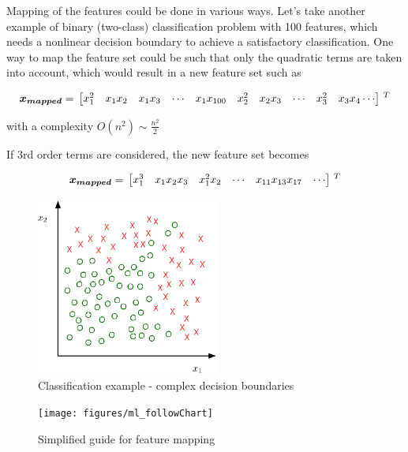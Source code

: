 Mapping of the features could be done in various ways. 
Let's take another example of binary (two-class) classification problem with 100 features, which needs a nonlinear decision boundary to achieve a satisfactory classification.
One way to map the feature set could be such that only the quadratic terms are taken into account, which would result in a new feature set such as
 
\begin{equation}{\label{eqn:featureMapping3}}
\bm{x_{mapped}}
=\,
\begin{bmatrix}
x_1^2 & x_1x_2 & x_1x_3 & \cdots & x_1x_{100} & x_2^2 & x_2x_3 & \cdots & x_3^2 & x_3x_4  \cdots  
\end{bmatrix}
\,^ T
\end{equation} 

with a complexity $O(n^2) \sim \frac{n^2}{2}$

If 3rd order terms are considered, the new feature set becomes

\begin{equation}{\label{eqn:featureMapping4}}
\bm{x_{mapped}}
=\,
\begin{bmatrix}
x_1^3 & x_1x_2x_3 & x_1^2x_2 & \cdots  & x_{11}x_{13}x_{17} & \cdots  
\end{bmatrix}
\,^ T
\end{equation} 

\begin{figure}
\begin{center}
\includegraphics[width=6cm]{figures/complexDecisionBoundary}    %
\caption{Classification example - complex decision boundaries} 
\label{fig:complexBoundary}
\end{center}
\end{figure}

\begin{figure}
\begin{center}
\texttt{[image: figures/ml\_followChart]}    %
\caption{Simplified guide for feature mapping} 
\label{fig:ml_followChart}
\end{center}
\end{figure}


